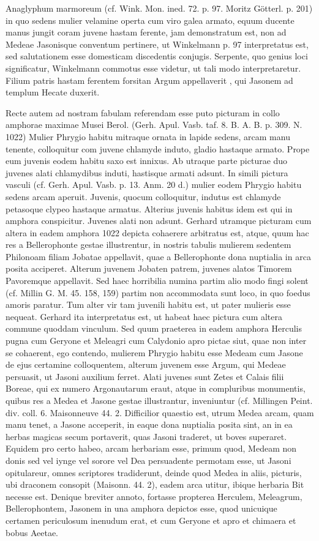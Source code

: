 \documentclass[a4paper, 11pt, oneside, polutonikogreek, german]{article}
\begin{document}
Anaglyphum marmoreum (cf. Wink. Mon. ined. 72. p. 97. Moritz Götterl. p. 201) in quo sedens mulier velamine operta cum viro galea armato, equum ducente manus jungit coram juvene hastam ferente, jam demonstratum est, non ad Medeae Jasonisque conventum pertinere, ut Winkelmann p. 97 interpretatus est, sed salutationem esse domesticam discedentis conjugis. Serpente, quo genius loci significatur, Winkelmann commotus esse videtur, ut tali modo interpretaretur. Filium patris hastam ferentem forsitan Argum appellaverit , qui Jasonem ad templum Hecate duxerit.

Recte autem ad nostram fabulam referendam esse puto picturam in collo amphorae maximae Musei Berol. (Gerh. Apul. Vasb. taf. 8. B. A. B. p. 309. N. 1022) Mulier Phrygio habitu mitraque ornata in lapide sedens, arcam manu tenente, colloquitur com juvene chlamyde induto, gladio hastaque armato. Prope eum juvenis eodem habitu saxo est innixus. Ab utraque parte picturae duo juvenes alati chlamydibus induti, hastisque armati adsunt. In simili pictura vasculi (cf. Gerh. Apul. Vasb. p. 13. Anm. 20 d.) mulier eodem Phrygio habitu sedens arcam aperuit. Juvenis, quocum colloquitur, indutus est chlamyde petasoque clypeo hastaque armatus. Alterius juvenis habitus idem est qui in amphora conspicitur. Juvenes alati non adsunt. Gerhard utramque picturam cum altera in eadem amphora 1022 depicta cohaerere arbitratus est, atque, quum hac res a Bellerophonte gestae illustrentur, in nostris tabulis mulierem sedentem Philonoam filiam Jobatae appellavit, quae a Bellerophonte dona nuptialia in arca posita acciperet. Alterum juvenem Jobaten patrem, juvenes alatos Timorem Pavoremque appellavit. Sed haec horribilia numina partim alio modo fingi solent (cf. Millin G. M. 45. 158, 159) partim non accommodata sunt loco, in quo foedus amoris paratur. Tum alter vir tam juvenili habitu est, ut pater mulieris esse nequeat. Gerhard ita interpretatus est, ut habeat haec pictura cum altera commune quoddam vinculum. Sed quum praeterea in eadem amphora Herculis pugna cum Geryone et Meleagri cum Calydonio apro pictae siut, quae non inter se cohaerent, ego contendo, mulierem Phrygio habitu esse Medeam cum Jasone de ejus certamine colloquentem, alterum juvenem esse Argum, qui Medeae persuasit, ut Jasoni auxilium ferret. Alati juvenes sunt Zetes et Calais filii Boreae, qui ex numero Argonautarum eraut, atque in compluribus monumentis, quibus res a Medea et Jasone gestae illustrantur, inveniuntur (cf. Millingen Peint. div. coll. 6. Maisonneuve 44. 2. Difficilior quaestio est, utrum Medea arcam, quam manu tenet, a Jasone acceperit, in eaque dona nuptialia posita sint, an in ea herbas magicas secum portaverit, quas Jasoni traderet, ut boves superaret. Equidem pro certo habeo, arcam herbariam esse, primum quod, Medeam non donis sed vel iynge vel sorore vel Dea persuadente permotam esse, ut Jasoni opitulareur, omnes scriptores tradiderunt, deinde quod Medea in aliis, picturis, ubi draconem consopit (Maisonn. 44. 2), eadem arca utitur, ibique herbaria Bit necesse est. Denique breviter annoto, fortasse propterea Herculem, Meleagrum, Bellerophontem, Jasonem in una amphora depictos esse, quod unicuique certamen periculosum inenudum erat, et cum Geryone et apro et chimaera et bobus Aeetae.
\end{document}
